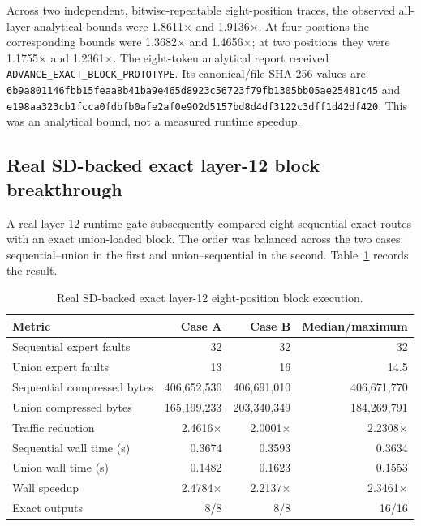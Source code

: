 Across two independent, bitwise-repeatable eight-position traces, the observed
all-layer analytical bounds were 1.8611$\times$ and 1.9136$\times$.  At four
positions the corresponding bounds were 1.3682$\times$ and 1.4656$\times$;
at two positions they were 1.1755$\times$ and 1.2361$\times$.  The eight-token
analytical report received
\texttt{ADVANCE\_EXACT\_BLOCK\_PROTOTYPE}.  Its canonical/file SHA-256 values
are
\texttt{6b9a801146fbb15feaa8b41ba9e465d8923c56723f79fb1305bb05ae25481c45}
and
\texttt{e198aa323cb1fcca0fdbfb0afe2af0e902d5157bd8d4df3122c3dff1d42df420}.
This was an analytical bound, not a measured runtime speedup.

\subsection{Real SD-backed exact layer-12 block breakthrough}

A real layer-12 runtime gate subsequently compared eight sequential exact
routes with an exact union-loaded block.  The order was balanced across the two
cases: sequential--union in the first and union--sequential in the second.
Table~\ref{tab:exact-layer12-block} records the result.

\begin{table}[htbp]
\centering
\small
\begin{tabular}{lrrr}
\hline
Metric & Case A & Case B & Median/maximum \\
\hline
Sequential expert faults & 32 & 32 & 32 \\
Union expert faults & 13 & 16 & 14.5 \\
Sequential compressed bytes & 406,652,530 & 406,691,010 & 406,671,770 \\
Union compressed bytes & 165,199,233 & 203,340,349 & 184,269,791 \\
Traffic reduction & 2.4616$\times$ & 2.0001$\times$ & 2.2308$\times$ \\
Sequential wall time (s) & 0.3674 & 0.3593 & 0.3634 \\
Union wall time (s) & 0.1482 & 0.1623 & 0.1553 \\
Wall speedup & 2.4784$\times$ & 2.2137$\times$ & 2.3461$\times$ \\
Exact outputs & 8/8 & 8/8 & 16/16 \\
\hline
\end{tabular}
\caption{Real SD-backed exact layer-12 eight-position block execution.}
\label{tab:exact-layer12-block}
\end{table}

